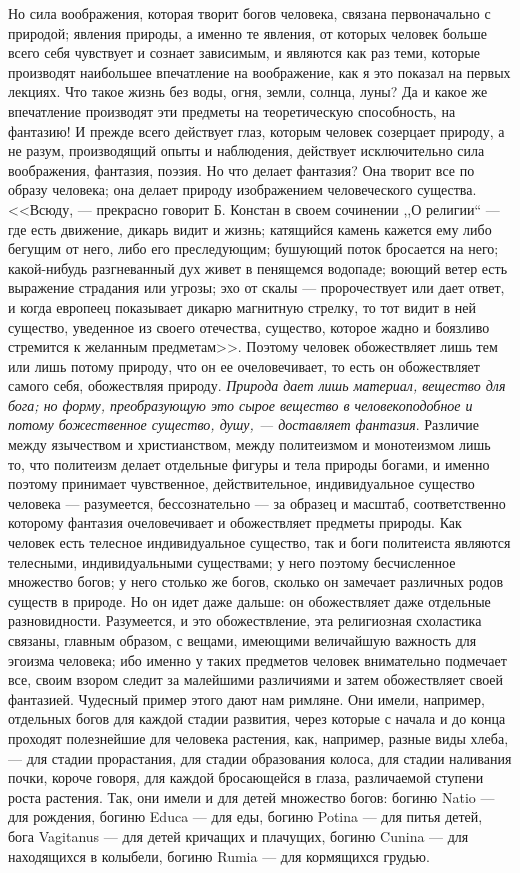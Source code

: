 \documentclass[12pt]{article}
\begin{document}
Но сила воображения, которая творит богов человека, связана первоначально с природой; явления природы, а именно те явления, от которых человек больше всего себя чувствует и сознает зависимым, и являются как раз теми, которые производят наибольшее впечатление на воображение, как я это показал на первых лекциях. Что такое жизнь без воды, огня, земли, солнца, луны? Да и какое же впечатление производят эти предметы на теоретическую способность, на фантазию! И прежде всего действует глаз, которым человек созерцает природу, а не разум, производящий опыты и наблюдения, действует исключительно сила воображения, фантазия, поэзия. Но что делает фантазия? Она творит все по образу человека; она делает природу изображением человеческого существа. <<Всюду, --- прекрасно говорит Б. Констан в своем сочинении ,,О религии``  --- где есть движение, дикарь видит и жизнь; катящийся камень кажется ему либо бегущим от него, либо его преследующим; бушующий поток бросается на него; какой-нибудь разгневанный дух живет в пенящемся водопаде; воющий ветер есть выражение страдания или угрозы; эхо от скалы --- пророчествует или дает ответ, и когда европеец показывает дикарю магнитную стрелку, то тот видит в ней существо, уведенное из своего отечества, существо, которое жадно и боязливо стремится к желанным предметам>>. Поэтому человек обожествляет лишь тем или лишь потому природу, что он ее очеловечивает, то есть он обожествляет самого себя, обожествляя природу. \emph{Природа дает лишь материал, вещество для бога; но форму, преобразующую это сырое вещество в человекоподобное и потому божественное существо, душу, --- доставляет фантазия}. Различие между язычеством и христианством, между политеизмом и монотеизмом лишь то, что политеизм делает отдельные фигуры и тела природы богами, и именно поэтому принимает чувственное, действительное, индивидуальное существо человека --- разумеется, бессознательно --- за образец и масштаб, соответственно которому фантазия очеловечивает и обожествляет предметы природы. Как человек есть телесное индивидуальное существо, так и боги политеиста являются телесными, индивидуальными существами; у него поэтому бесчисленное множество богов; у него столько же богов, сколько он замечает различных родов существ в природе. Но он идет даже дальше: он обожествляет даже отдельные разновидности. Разумеется, и это обожествление, эта религиозная схоластика связаны, главным образом, с вещами, имеющими величайшую важность для эгоизма человека; ибо именно у таких предметов человек внимательно подмечает все, своим взором следит за малейшими различиями и затем обожествляет своей фантазией. Чудесный пример этого дают нам римляне. Они имели, например, отдельных богов для каждой стадии развития, через которые с начала и до конца проходят полезнейшие для человека растения, как, например, разные виды хлеба, --- для стадии прорастания, для стадии образования колоса, для стадии наливания почки, короче говоря, для каждой бросающейся в глаза, различаемой ступени роста растения. Так, они имели и для детей множество богов: богиню Natio --- для рождения, богиню Educa --- для еды, богиню Potina --- для питья детей, бога Vagitanus --- для детей кричащих и плачущих, богиню Cunina --- для находящихся в колыбели, богиню Rumia --- для кормящихся грудью. 
\end{document}
